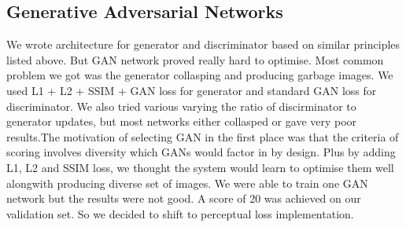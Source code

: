 \documentclass[11pt,a4paper]{article}
\begin{document}
\subsection{Generative Adversarial Networks}
We wrote architecture for generator and discriminator based on similar principles listed above. But GAN network proved really hard to optimise. Most common problem we got was the generator collasping and producing garbage images. We used L1 + L2 + SSIM + GAN loss for generator and standard GAN loss for discriminator. We also tried various varying the ratio of discirminator to generator updates, but most networks either collasped or gave very poor results.The motivation of selecting GAN in the first place was that the criteria of scoring involves diversity which GANs would factor in by design. Plus by adding L1, L2 and SSIM loss, we thought the system would learn to optimise them well alongwith producing diverse set of images. We were able to train one GAN network but the results were not good. A score of 20 was achieved on our validation set. So we decided to shift to perceptual loss implementation.   
\end{document}
